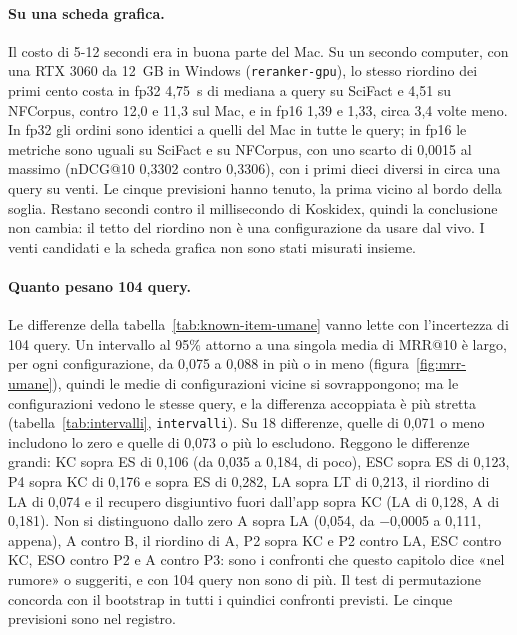 \paragraph{Su una scheda grafica.} Il costo di 5-12 secondi era in buona parte
del Mac. Su un secondo computer, con una RTX 3060 da 12~GB in Windows
(\texttt{reranker-gpu}), lo stesso riordino dei primi cento costa in fp32
4,75~s di mediana a query su SciFact e 4,51 su NFCorpus, contro 12,0 e 11,3 sul
Mac, e in fp16 1,39 e 1,33, circa 3,4 volte meno. In fp32 gli ordini sono
identici a quelli del Mac in tutte le query; in fp16 le metriche sono uguali su
SciFact e su NFCorpus, con uno scarto di 0,0015 al massimo (nDCG@10 0,3302 contro
0,3306), con i primi dieci diversi in circa una query su venti. Le cinque
previsioni hanno tenuto, la prima vicino al bordo della soglia. Restano secondi
contro il millisecondo di Koskidex, quindi la conclusione non cambia: il tetto
del riordino non è una configurazione da usare dal vivo. I venti candidati e la
scheda grafica non sono stati misurati insieme.

\paragraph{Quanto pesano 104 query.} Le differenze della
tabella~\ref{tab:known-item-umane} vanno lette con l'incertezza di 104 query.
Un intervallo al 95\% attorno a una singola media di MRR@10 è largo, per ogni
configurazione, da 0,075 a 0,088 in più o in meno (figura~\ref{fig:mrr-umane}), quindi le medie
di configurazioni vicine si sovrappongono; ma le configurazioni vedono le
stesse query, e la differenza accoppiata è più stretta
(tabella~\ref{tab:intervalli}, \texttt{intervalli}). Su 18 differenze, quelle
di 0,071 o meno includono lo zero e quelle di 0,073 o più lo escludono. Reggono
le differenze grandi: KC sopra ES di 0,106 (da 0,035 a 0,184, di poco),
ESC sopra ES di 0,123, P4 sopra KC di 0,176 e sopra ES di 0,282, LA sopra LT di
0,213, il riordino di LA di 0,074 e il recupero disgiuntivo fuori dall'app
sopra KC (LA di 0,128, A di 0,181). Non si distinguono dallo zero A sopra LA
(0,054, da $-$0,0005 a 0,111, appena), A contro B, il riordino di A, P2 sopra KC
e P2 contro LA, ESC contro KC, ESO contro P2 e A contro P3: sono i confronti
che questo capitolo dice «nel rumore» o suggeriti, e con 104 query non sono di
più. Il test di permutazione concorda con il bootstrap in tutti i quindici
confronti previsti. Le cinque previsioni sono nel registro.



